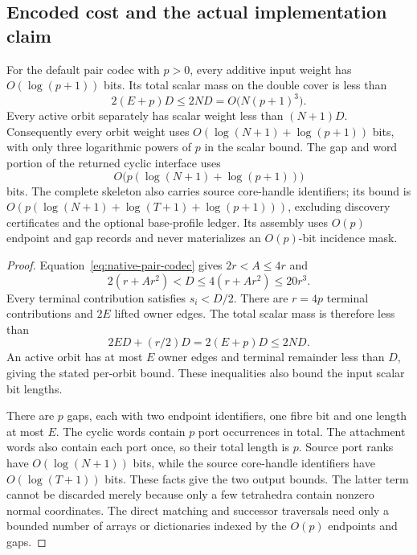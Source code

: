 \subsection{Encoded cost and the actual implementation claim}

\begin{proposition}
\label{prop:native-moment-size}
For the default pair codec with $p>0$, every additive input weight has
$O(\log(p+1))$ bits.  Its total scalar mass on the double cover is less
than
\begin{equation}
\label{eq:native-total-mass}
             2(E+p)D\leq2ND=O\bigl(N(p+1)^3\bigr).
\end{equation}
Every active orbit separately has scalar weight less than $(N+1)D$.
Consequently every orbit weight uses
$O(\log(N+1)+\log(p+1))$ bits, with only three logarithmic powers of $p$
in the scalar bound.  The gap and word portion of the returned cyclic
interface uses
\[
                  O\bigl(p(\log(N+1)+\log(p+1))\bigr)
\]
bits.  The complete skeleton also carries source core-handle identifiers;
its bound is $O(p(\log(N+1)+\log(T+1)+\log(p+1)))$, excluding discovery
certificates and the optional base-profile ledger.  Its assembly uses
$O(p)$ endpoint and gap records and never materializes an $O(p)$-bit
incidence mask.
\end{proposition}

\begin{proof}
Equation~\eqref{eq:native-pair-codec} gives $2r<A\leq4r$ and
\[
   2(r+A r^2)<D\leq4(r+A r^2)\leq20r^3.
\]
Every terminal contribution satisfies $s_i<D/2$.  There are $r=4p$
terminal contributions and $2E$ lifted owner edges.  The total scalar
mass is therefore less than
\[
                    2ED+(r/2)D=2(E+p)D\leq2ND.
\]
An active orbit has at most $E$ owner edges and terminal remainder less
than $D$, giving the stated per-orbit bound.  These inequalities also
bound the input scalar bit lengths.

There are $p$ gaps, each with two endpoint identifiers, one fibre bit and
one length at most $E$.  The cyclic words contain $p$ port occurrences in
total.  The attachment words also contain each port once, so their total
length is $p$.  Source port ranks have $O(\log(N+1))$ bits, while the
source core-handle identifiers have $O(\log(T+1))$ bits.  These facts give
the two output bounds.  The latter term cannot be discarded merely because
only a few tetrahedra contain nonzero normal coordinates.  The direct
matching and successor traversals need only a bounded number of arrays
or dictionaries indexed by the $O(p)$ endpoints and gaps.
\end{proof}


